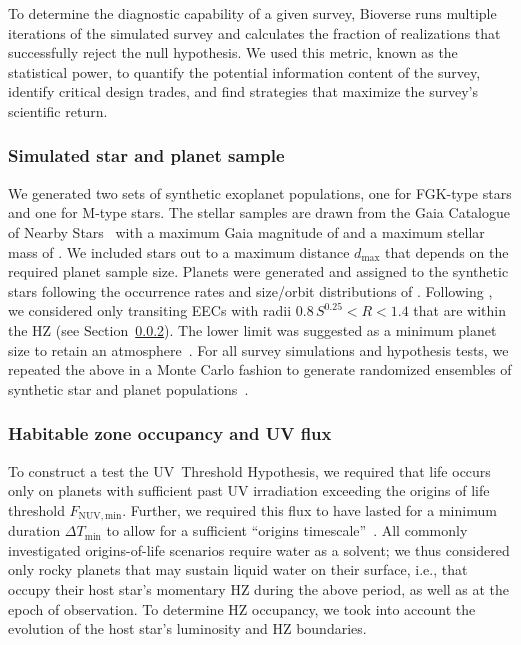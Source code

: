 \documentclass[twocolumn,twocolappendix,linenumbers]{aastex631}
\begin{document}
To determine the diagnostic capability of a given survey, Bioverse runs multiple iterations of the simulated survey and calculates the fraction of realizations that successfully reject the null hypothesis.
We used this metric, known as the statistical power, to quantify the potential information content of the survey, identify critical design trades, and find strategies that maximize the survey's scientific return.


\subsubsection{Simulated star and planet sample}
We generated two sets of synthetic exoplanet populations, one for FGK-type stars and one for M-type stars.
The stellar samples are drawn from the Gaia Catalogue of Nearby Stars~\citep{Smart2021} with a maximum Gaia magnitude of  and a maximum stellar mass of  \SI{}{\Msun}.
We included stars out to a maximum distance $d_{\max}$ that depends on the required planet sample size.
Planets were generated and assigned to the synthetic stars following the occurrence rates and size/orbit distributions of \citet{Bergsten2022}.
Following \citet{Bixel2021}, we considered only transiting \glspl{EEC} with radii $0.8\, S^{0.25} < R < 1.4 $ that are within the \gls{HZ} (see Section~\ref{sec:met-hz}).
The lower limit was suggested as a minimum planet size to retain an atmosphere~\citep{Zahnle2017}.
For all survey simulations and hypothesis tests, we repeated the above in a Monte Carlo fashion to generate randomized ensembles of synthetic star and planet populations~\citep[][]{Bixel2021}.



\subsubsection{Habitable zone occupancy and UV flux}\label{sec:met-hz}
To construct a test the UV~Threshold Hypothesis, we required that life occurs only on planets with sufficient past UV irradiation exceeding the origins of life threshold $F_\mathrm{NUV, min}$.
Further, we required this flux to have lasted for a minimum duration $\Delta T_\mathrm{min}$ to allow for a sufficient ``origins timescale''~\citep{Rimmer2023}.
All commonly investigated origins-of-life scenarios require water as a solvent;
we thus considered only rocky planets that may sustain liquid water on their surface, i.e., that occupy their host star's momentary \gls{HZ} during the above period, as well as at the epoch of observation.
To determine \gls{HZ} occupancy, we took into account the evolution of the host star's luminosity and \gls{HZ} boundaries.
\end{document}
